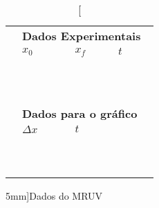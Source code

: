 \begin{table*}[!ht]
\centering
\begin{tabular}{lp{25mm}p{25mm}p{25mm}l}
\toprule
	&\multicolumn{4}{l}{\textbf{Dados Experimentais}} \\
	\cmidrule{2-4}
	& $x_0$ & $x_f$ & $t$ & \\
	\cmidrule{2-4}
	& \cellcolor[gray]{0.89} & \cellcolor[gray]{0.92} & \cellcolor[gray]{0.89} \\
	& \cellcolor[gray]{0.95} & \cellcolor[gray]{0.97} & \cellcolor[gray]{0.95} \\
	& \cellcolor[gray]{0.89} & \cellcolor[gray]{0.92} & \cellcolor[gray]{0.89} \\
	& \cellcolor[gray]{0.95} & \cellcolor[gray]{0.97} & \cellcolor[gray]{0.95} \\
	& \cellcolor[gray]{0.89} & \cellcolor[gray]{0.92} & \cellcolor[gray]{0.89} \\
	& \cellcolor[gray]{0.95} & \cellcolor[gray]{0.97} & \cellcolor[gray]{0.95} \\
	& \cellcolor[gray]{0.89} & \cellcolor[gray]{0.92} & \cellcolor[gray]{0.89} \\
	& \cellcolor[gray]{0.95} & \cellcolor[gray]{0.97} & \cellcolor[gray]{0.95} \\
	& \cellcolor[gray]{0.89} & \cellcolor[gray]{0.92} & \cellcolor[gray]{0.89} \\
	& \cellcolor[gray]{0.95} & \cellcolor[gray]{0.97} & \cellcolor[gray]{0.95} \\
	\cmidrule{2-4}
\\
	& \multicolumn{3}{l}{\textbf{Dados para o gráfico}} \\
	\cmidrule{2-3}
	& $\Delta x$ & $t$ \\
	\cmidrule{2-3}
	& \cellcolor[gray]{0.89} & \cellcolor[gray]{0.92} \\
	& \cellcolor[gray]{0.95} & \cellcolor[gray]{0.97} \\
	& \cellcolor[gray]{0.89} & \cellcolor[gray]{0.92} \\
	& \cellcolor[gray]{0.95} & \cellcolor[gray]{0.97} \\
	& \cellcolor[gray]{0.89} & \cellcolor[gray]{0.92} \\
	& \cellcolor[gray]{0.95} & \cellcolor[gray]{0.97} \\
	& \cellcolor[gray]{0.89} & \cellcolor[gray]{0.92} \\
	& \cellcolor[gray]{0.95} & \cellcolor[gray]{0.97} \\
	& \cellcolor[gray]{0.89} & \cellcolor[gray]{0.92} \\
	& \cellcolor[gray]{0.95} & \cellcolor[gray]{0.97} \\
	\cmidrule{2-3}
\bottomrule
\end{tabular}
\caption[][5mm]{Dados do MRUV}
\label{DadosMRUV}
\end{table*}

